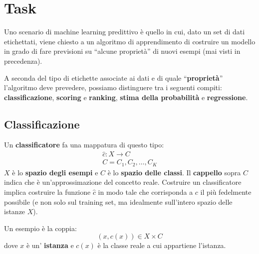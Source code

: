\chapter{Task}
Uno scenario di machine learning predittivo è quello in cui, dato un set di dati etichettati, viene chiesto a un algoritmo di apprendimento di costruire un modello in grado di fare previsioni su “alcune proprietà” di nuovi esempi (mai visti in precedenza).

A seconda del tipo di etichette associate ai dati e di quale “\textbf{proprietà}” l’algoritmo deve prevedere, possiamo distinguere tra i seguenti compiti: \textbf{classificazione}, \textbf{scoring} e \textbf{ranking}, \textbf{stima della probabilità} e \textbf{regressione}.

\section{Classificazione}
Un \textbf{classificatore} fa una mappatura di questo tipo:
\begin{equation}
\begin{split}
    \hat{c} : X \rightarrow C \\
    C={C_1,C_2,\dots,C_K}
\end{split}
\end{equation}
$X$ è lo \textbf{spazio degli esempi} e $C$ è lo \textbf{spazio delle classi}.
Il \textbf{cappello} sopra $C$ indica che è un'approssimazione del concetto reale.
Costruire un classificatore implica costruire la funzione $\hat{c}$ in modo tale che corrisponda a $c$ il più fedelmente possibile (e non solo sul training set, ma idealmente sull'intero spazio delle istanze $X$).

Un esempio è la coppia:
\begin{equation}
    (x,c(x))\in X \times C
\end{equation}
dove $x$ è un' \textbf{istanza} e $c(x)$ è la classe reale a cui appartiene l'istanza.

